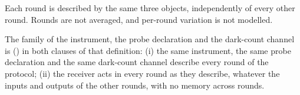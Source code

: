 
Each round is described by the same three objects, independently of every
other round. Rounds are not averaged, and per-round variation is not modelled.

\begin{assumption}\label{ass:round}
The family of the instrument, the probe declaration and the dark-count channel
is  () in both
clauses of that definition:
(i) the same instrument, the same probe declaration and the same dark-count
channel describe every round of the protocol;
(ii) the receiver acts in every round as they describe, whatever the inputs
and outputs of the other rounds, with no memory across rounds.
\end{assumption}
